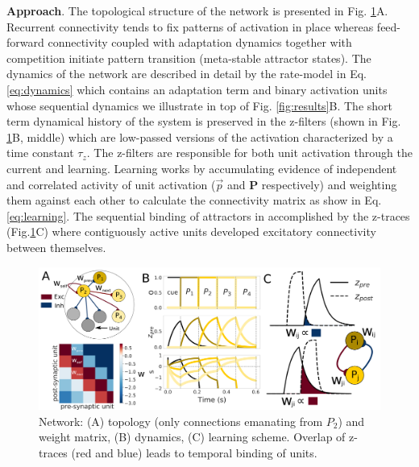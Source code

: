 \documentclass[12pt, a4paper]{article}
\begin{document}
\textbf{Approach}. The topological structure of the network is presented in Fig. \ref{fig:model}A. Recurrent connectivity tends to fix patterns of activation in place whereas feed-forward connectivity coupled with adaptation dynamics together with competition initiate pattern transition (meta-stable attractor states). The dynamics of the network are described in detail by the rate-model in Eq. \ref{eq:dynamics} which contains an adaptation term and binary activation units whose sequential dynamics we illustrate in top of Fig. \ref{fig:results}B. The short term dynamical history of the system is preserved in the z-filters (shown in Fig. \ref{fig:model}B, middle) which are low-passed versions of the activation characterized by a time constant $\tau_z$. The z-filters are responsible for both unit activation through the current and learning. Learning works by accumulating evidence of independent and correlated activity of unit activation ($\vec{p}$ and $\mathbf{P}$ respectively) and weighting them against each other to calculate the connectivity matrix as show in Eq. \ref{eq:learning}. The sequential binding of attractors in accomplished by the z-traces (Fig.\ref{fig:model}C) where contiguously active units developed excitatory connectivity between themselves. 


\begin{figure}[H]
\centering
\includegraphics[scale=0.29]{model.png}
\caption{Network: (A) topology (only connections emanating from $P_2$) and weight matrix, (B) dynamics, (C) learning scheme. Overlap of z-traces (red and blue) leads to temporal binding of units.}
\label{fig:model}
\end{figure}

\end{document}
